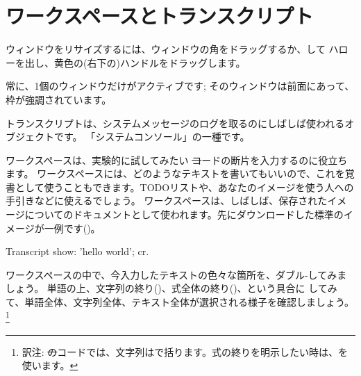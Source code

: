 \documentclass[a4paper,10pt,twoside]{book}
\begin{document}
\section{ワークスペースとトランスクリプト}


ウィンドウをリサイズするには、ウィンドウの角をドラッグするか、\metaclick して ハローを出し、黄色の(右下の)ハンドルをドラッグします。

常に、1個のウィンドウだけがアクティブです; そのウィンドウは前面にあって、枠が強調されています。

トランスクリプトは、システムメッセージのログを取るのにしばしば使われるオブジェクトです。
「システムコンソール」の一種です。

ワークスペースは、実験的に試してみたい \st コードの断片を入力するのに役立ちます。
ワークスペースには、どのようなテキストを書いてもいいので、これを覚書として使うこともできます。TODOリストや、あなたのイメージを使う人への手引きなどに使えるでしょう。
ワークスペースは、しばしば、保存されたイメージについてのドキュメントとして使われます。先にダウンロードした標準のイメージが一例です()。

\begin{code}{}
Transcript show: 'hello world'; cr.
\end{code}

ワークスペースの中で、今入力したテキストの色々な箇所を、ダブル-\click してみましょう。
単語の上、文字列の終り()、式全体の終り()、という具合に \click してみて、単語全体、文字列全体、テキスト全体が選択される様子を確認しましょう。\footnote{訳注: \st のコードでは、文字列はで括ります。式の終りを明示したい時は、を使います。}
\end{document}
